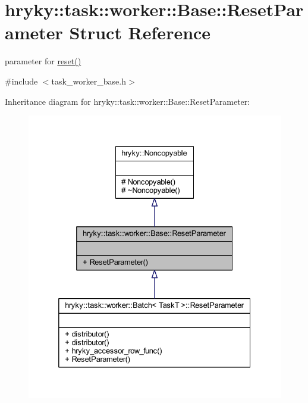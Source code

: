 \hypertarget{structhryky_1_1task_1_1worker_1_1_base_1_1_reset_parameter}{\section{hryky\-:\-:task\-:\-:worker\-:\-:Base\-:\-:Reset\-Parameter Struct Reference}
\label{structhryky_1_1task_1_1worker_1_1_base_1_1_reset_parameter}
}


parameter for \hyperlink{classhryky_1_1task_1_1worker_1_1_base_a2dfa3093b3165d58ed31aa575ae1b159}{reset()}  




{\ttfamily \#include $<$task\-\_\-worker\-\_\-base.\-h$>$}



Inheritance diagram for hryky\-:\-:task\-:\-:worker\-:\-:Base\-:\-:Reset\-Parameter\-:\nopagebreak
\begin{figure}[H]
\begin{center}
\leavevmode
\includegraphics[width=332pt]{structhryky_1_1task_1_1worker_1_1_base_1_1_reset_parameter__inherit__graph}
\end{center}
\end{figure}

